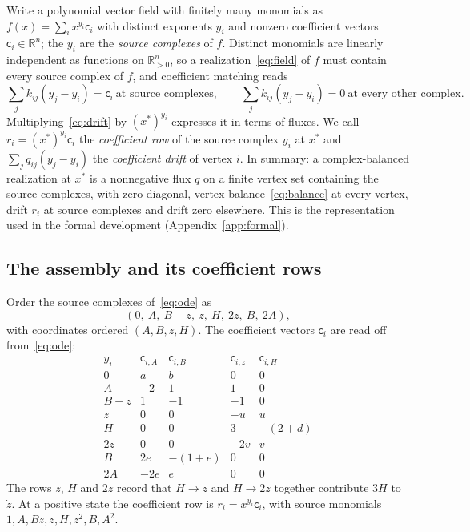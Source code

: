 \documentclass[11pt,a4paper]{article}
\theoremstyle{plain}
\theoremstyle{definition}
\theoremstyle{remark}
\newcommand{\R}{\mathbb{R}}
\newcommand{\Rp}{\R_{>0}}
\newcommand{\cc}{\mathsf{c}}
\newcommand{\xs}{x^{*}}
\begin{document}
Write a polynomial vector field with finitely many monomials as $f(x)=\sum_ix^{y_i}\cc_i$ with distinct exponents $y_i$ and nonzero coefficient vectors $\cc_i\in\R^n$; the $y_i$ are the \emph{source complexes} of $f$. Distinct monomials are linearly independent as functions on $\Rp^n$, so a realization~\eqref{eq:field} of $f$ must contain every source complex of $f$, and coefficient matching reads
\begin{equation}\label{eq:drift}
\sum_jk_{ij}(y_j-y_i)=\cc_i\ \text{at source complexes},\qquad
\sum_jk_{ij}(y_j-y_i)=0\ \text{at every other complex}.
\end{equation}
Multiplying~\eqref{eq:drift} by $(\xs)^{y_i}$ expresses it in terms of fluxes. We call $r_i=(\xs)^{y_i}\cc_i$ the \emph{coefficient row} of the source complex $y_i$ at $\xs$ and $\sum_jq_{ij}(y_j-y_i)$ the \emph{coefficient drift} of vertex $i$. In summary: a complex-balanced realization at $\xs$ is a nonnegative flux $q$ on a finite vertex set containing the source complexes, with zero diagonal, vertex balance~\eqref{eq:balance} at every vertex, drift $r_i$ at source complexes and drift zero elsewhere. This is the representation used in the formal development (Appendix~\ref{app:formal}).

\subsection{The assembly and its coefficient rows}

Order the source complexes of~\eqref{eq:ode} as
\[
(0,\ A,\ B+z,\ z,\ H,\ 2z,\ B,\ 2A),
\]
with coordinates ordered $(A,B,z,H)$. The coefficient vectors $\cc_i$ are read off from~\eqref{eq:ode}:
\begin{equation}\label{eq:rows}
\begin{array}{c|rrrr}
y_i&\cc_{i,A}&\cc_{i,B}&\cc_{i,z}&\cc_{i,H}\\\hline
0&a&b&0&0\\
A&-2&1&1&0\\
B+z&1&-1&-1&0\\
z&0&0&-u&u\\
H&0&0&3&-(2+d)\\
2z&0&0&-2v&v\\
B&2e&-(1+e)&0&0\\
2A&-2e&e&0&0
\end{array}
\end{equation}
The rows $z$, $H$ and $2z$ record that $H\to z$ and $H\to2z$ together contribute $3H$ to $\dot z$. At a positive state the coefficient row is $r_i=x^{y_i}\cc_i$, with source monomials $1,A,Bz,z,H,z^2,B,A^2$.
\end{document}
